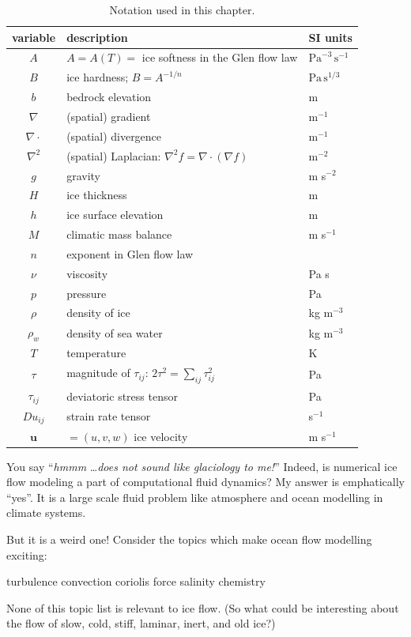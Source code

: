 \documentclass[titlepage,letterpaper,final,12pt]{scrartcl}
\begin{document}
\begin{table}%
\caption{Notation used in this chapter.}
\label{tab:notation}
\begin{tabular}{cll}
variable  & description & SI units \\ 
\hline
$A$ & $A=A(T)=$ ice softness in the Glen flow law & $\text{Pa}^{-3}\,\text{s}^{-1}$ \\
$B$ & ice hardness; $B=A^{-1/n}$ & $\text{Pa}\,\text{s}^{1/3}$ \\
$b$ & bedrock elevation & m \\
$\nabla$ & (spatial) gradient & m$^{-1}$ \\
$\nabla\cdot$ & (spatial) divergence & m$^{-1}$ \\
$\nabla^2$ & (spatial) Laplacian: $\nabla^2 f = \nabla\cdot(\nabla f)$ & m$^{-2}$ \\
$g$ & gravity & m s$^{-2}$ \\
$H$ & ice thickness & m \\
$h$ & ice surface elevation & m \\
$M$ & climatic mass balance & m s$^{-1}$ \\
$n$ & exponent in Glen flow law & \\
$\nu$ & viscosity & Pa s \\
$p$ & pressure & Pa \\
$\rho$ & density of ice & kg m$^{-3}$ \\
$\rho_w$ & density of sea water & kg m$^{-3}$ \\
$T$ & temperature & K \\
$\tau$ & magnitude of $\tau_{ij}$: \quad $2 \tau^2 = \sum_{ij} \tau_{ij}^2$ & Pa \\
$\tau_{ij}$ & deviatoric stress tensor & Pa \\
$Du_{ij}$ & strain rate tensor & s$^{-1}$ \\
$\mathbf{u}$ & $=(u,v,w)$ ice velocity & m s$^{-1}$ \\
\end{tabular}
\end{table}

You say ``\emph{hmmm} \dots \emph{does not sound like glaciology to me!}''  Indeed, is numerical ice flow modeling a part of computational fluid dynamics?  My answer is emphatically ``yes''.  It is a large scale fluid problem like atmosphere and ocean modelling in climate systems.

But it is a weird one!  Consider the topics which make ocean flow modelling exciting:
  \begin{center} turbulence \qquad convection \qquad  coriolis force  \qquad salinity \qquad chemistry
  \end{center}
None of this topic list is relevant to ice flow.  (So what could be interesting about the flow of slow, cold, stiff, laminar, inert, and old ice?)
\end{document}
